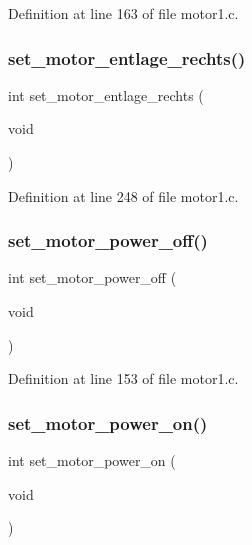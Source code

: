 Definition at line 163 of file motor1.\+c.

\mbox{\label{motor_8h_ae7371f4fed363ba54f2f894ac3720c06}} 
\subsubsection{set\+\_\+motor\+\_\+entlage\+\_\+rechts()}
{\footnotesize\ttfamily int set\+\_\+motor\+\_\+entlage\+\_\+rechts (\begin{DoxyParamCaption}\item[{void}]{ }\end{DoxyParamCaption})}



Definition at line 248 of file motor1.\+c.

\mbox{\label{motor_8h_aca930076cffa70b62efe0f7f4281f80d}} 
\subsubsection{set\+\_\+motor\+\_\+power\+\_\+off()}
{\footnotesize\ttfamily int set\+\_\+motor\+\_\+power\+\_\+off (\begin{DoxyParamCaption}\item[{void}]{ }\end{DoxyParamCaption})}



Definition at line 153 of file motor1.\+c.

\mbox{\label{motor_8h_a880850784362150376faf21b3ce817ca}} 
\subsubsection{set\+\_\+motor\+\_\+power\+\_\+on()}
{\footnotesize\ttfamily int set\+\_\+motor\+\_\+power\+\_\+on (\begin{DoxyParamCaption}\item[{void}]{ }\end{DoxyParamCaption})}



